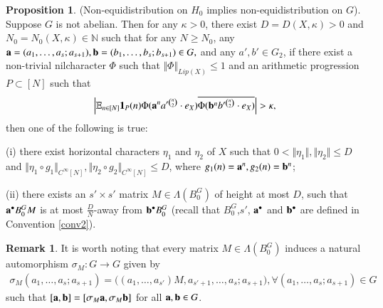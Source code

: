 \documentclass[12pt,amstex]{amsart}
\theoremstyle{definition}
\newtheorem{rem}[thm]{Remark}
\newtheorem{prop}[thm]{Proposition}
\def \D {\kappa}
\def \a {\bold{a}}
\def \b {\bold{b}}
\begin{document}
\begin{prop}\label{last}(Non-equidistribution on $H_{0}$ implies non-equidistribution on $G$). Suppose $G$ is not abelian.
  Then for any $\D>0$, there exist $D=D(X,\D)>0$ and $N_{0}=N_{0}(X,\D)\in\mathbb{N}$ such that for any $N\geq N_{0}$, any $\a=(a_{1},\dots,a_{s};a_{s+1}),
\b=(b_{1},\dots,b_{s};b_{s+1})\in G,$ and any $a',b'\in G_{2}$,
 if there exist a non-trivial nilcharacter $\Phi$ such that $\Vert\Phi\Vert_{Lip(X)}\leq 1$ and an arithmetic progression $P\subset[N]$ such that
  \begin{equation}\nonumber
    \begin{split}
      \Bigl\vert\mathbb{E}_{n\in[N]}\bold{1}_{P}(n)\Phi(\a^{n}a'^{\binom{n}{2}}\cdot e_{X})\overline{\Phi(\b^{n}b'^{\binom{n}{2}}\cdot e_{X})}\Bigr\vert>\D,
    \end{split}
  \end{equation}
  then one of the following is true:


  (i) there exist horizontal characters $\eta_{1}$ and $\eta_{2}$ of $X$ such that $0<\Vert\eta_{1}\Vert, \Vert\eta_{2}\Vert\leq D$ and $\Vert\eta_{1}\circ g_{1}\Vert_{C^{\infty}[N]},\Vert\eta_{2}\circ g_{2}\Vert_{C^{\infty}[N]}\leq D$,
where $g_{1}(n)=\a^{n}, g_{2}(n)=\b^{n}$;

  (ii) there exists an $s'\times s'$ matrix $M\in \Lambda(B_{0}^{G})$ of height at most $D$, such that $\a^{\bullet}B_{0}^{G}M$ is at most $\frac{D}{N}$-away from $\b^{\bullet}B_{0}^{G}$ (recall that $B_{0}^{G}$,$s'$, $\a^{\bullet}$ and $\b^{\bullet}$ are defined in Convention \ref{conv2}).
\end{prop}
\begin{rem}
  It is worth noting that every matrix $M\in \Lambda(B_{0}^{G})$ induces a natural automorphism $\sigma_{M}\colon G\rightarrow G$ given by
    \begin{equation}\nonumber
    \begin{split}
      \sigma_{M}(a_{1},\dots,a_{s};a_{s+1})=\bigl((a_{1},\dots,a_{s'})M,a_{s'+1},\dots,a_{s};a_{s+1}\bigr), \forall (a_{1},\dots,a_{s};a_{s+1})\in G
    \end{split}
  \end{equation}
  such that $[\a,\b]=[\sigma_{M}\a,\sigma_{M}\b]$ for all $\a,\b\in G$.
\end{rem}
\end{document}
